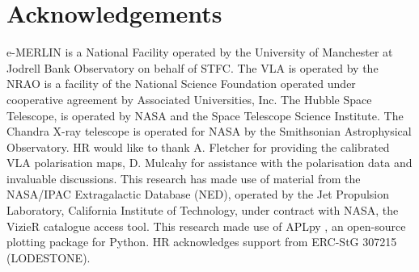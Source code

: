 \documentclass[fleqn,usenatbib]{mnras}
\begin{document}
\section*{Acknowledgements}

e-MERLIN is a National Facility operated by the University of Manchester at Jodrell Bank Observatory on behalf of STFC. The VLA is operated by the NRAO is a facility of the National Science Foundation operated under cooperative agreement by Associated Universities, Inc. The Hubble Space Telescope, is operated by NASA and the Space Telescope Science Institute. The Chandra X-ray telescope is operated for NASA by the Smithsonian Astrophysical Observatory. HR would like to thank A. Fletcher for providing the calibrated VLA polarisation maps, D. Mulcahy for assistance with the polarisation data and invaluable discussions. This research has made use of material from the NASA/IPAC Extragalactic Database (NED), operated by the Jet Propulsion Laboratory, California Institute of Technology, under contract with NASA, the VizieR catalogue access tool. This research made use of APLpy \citep{RB2012}, an open-source plotting package for Python. HR acknowledges support from ERC-StG 307215 (LODESTONE).


\small




\end{document}

